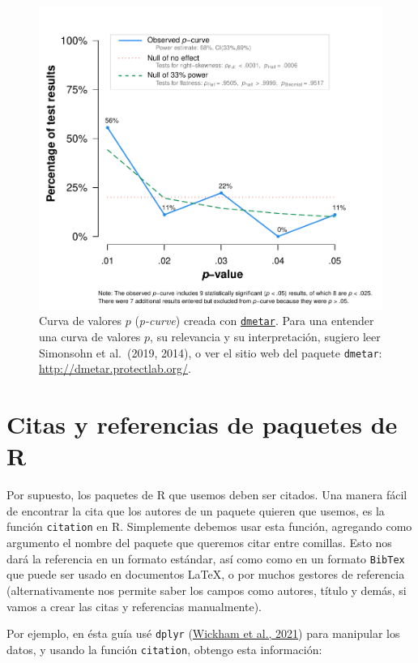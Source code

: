 \documentclass[
  bookmarksnumbered]{article}
\begin{document}
\begin{figure}
\centering
\includegraphics{images/pcurve.pdf}
\caption{\label{fig:pcurve-plot}Curva de valores \(p\) (\emph{p-curve}) creada con \href{http://dmetar.protectlab.org/}{\texttt{dmetar}}. Para una entender una curva de valores \(p\), su relevancia y su interpretación, sugiero leer Simonsohn et al.~(2019, 2014), o ver el sitio web del paquete \texttt{dmetar}: \url{http://dmetar.protectlab.org/}.}
\end{figure}

\hypertarget{paquetes-cit}{%
\section{Citas y referencias de paquetes de R}\label{paquetes-cit}}

Por supuesto, los paquetes de R que usemos deben ser citados. Una manera fácil de encontrar la cita que los autores de un paquete quieren que usemos, es la función \texttt{citation} en R. Simplemente debemos usar esta función, agregando como argumento el nombre del paquete que queremos citar entre comillas. Esto nos dará la referencia en un formato estándar, así como como en un formato \texttt{BibTex} que puede ser usado en documentos \LaTeX, o por muchos gestores de referencia (alternativamente nos permite saber los campos como autores, título y demás, si vamos a crear las citas y referencias manualmente).

Por ejemplo, en ésta guía usé \texttt{dplyr} (\protect\hyperlink{ref-WickhamDplyr2021}{Wickham et al., 2021}) para manipular los datos, y usando la función \texttt{citation}, obtengo esta información:
\end{document}
